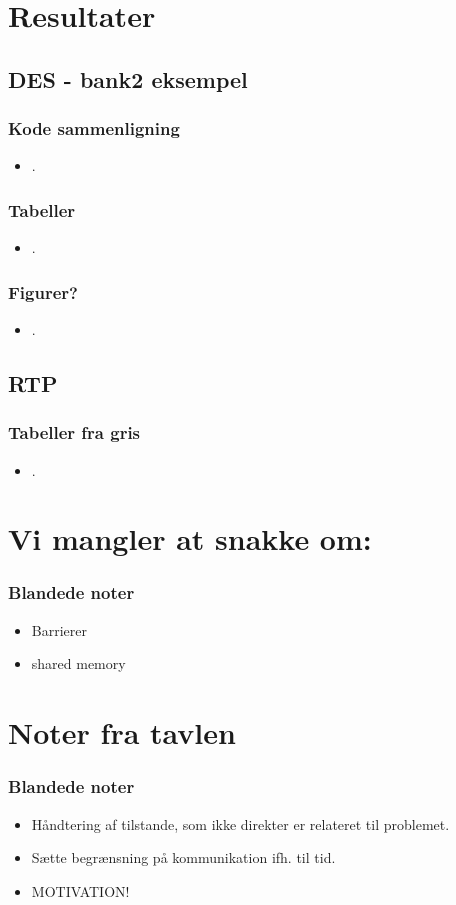 \documentclass{beamer}
\begin{document}
\section{Resultater}
\subsection{DES - bank2 eksempel}
\begin{frame}
  \frametitle{Kode sammenligning}
  \begin{itemize}
    \item .
  \end{itemize}
\end{frame}

\begin{frame}
  \frametitle{Tabeller}
  \begin{itemize}
    \item .
  \end{itemize}
\end{frame}

\begin{frame}
  \frametitle{Figurer?}
  \begin{itemize}
    \item .
  \end{itemize}
\end{frame}

\subsection{RTP}
\begin{frame}
  \frametitle{Tabeller fra gris}
  \begin{itemize}
    \item .
  \end{itemize}
\end{frame}


\section*{Vi mangler at snakke om:}
\begin{frame}
  \frametitle{Blandede noter}
  \begin{itemize}
    \item Barrierer
	\item shared memory
  \end{itemize}
\end{frame}



\section*{Noter fra tavlen}
\begin{frame}
  \frametitle{Blandede noter}
  \begin{itemize}
    \item Håndtering af tilstande, som ikke direkter er relateret til problemet.
    \item Sætte begrænsning på kommunikation ifh. til tid.
    \item MOTIVATION!
  \end{itemize}
\end{frame}
\end{document}

